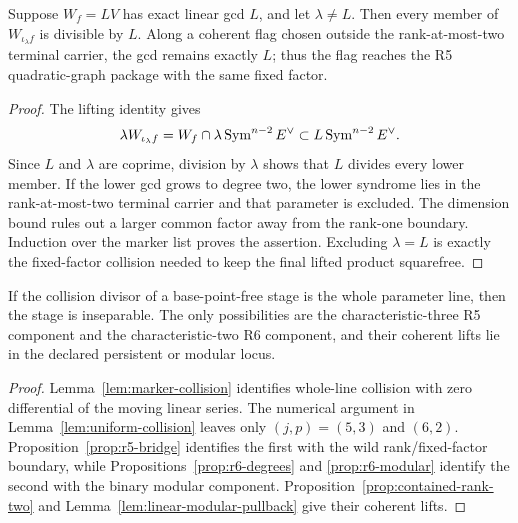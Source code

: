 \begin{lemma}
\label{lem:exact-linear-gcd-transport}%
%
%
Suppose \(W_f=L V\) has exact linear gcd \(L\), and let
\(\lambda\ne L\).  Then every member of
\(W_{\iota_\lambda f}\) is divisible by \(L\).  Along a coherent flag
chosen outside the rank-at-most-two terminal carrier, the gcd remains
exactly \(L\); thus the flag reaches the R5 quadratic-graph package with
the same fixed factor.
\end{lemma}

\begin{proof}
The lifting identity gives
\[
 \lambda W_{\iota_\lambda f}
   =W_f\cap\lambda\operatorname{Sym}^{n-2}E^\vee
   \subset L\operatorname{Sym}^{n-2}E^\vee .
\]
Since \(L\) and \(\lambda\) are coprime, division by \(\lambda\) shows
that \(L\) divides every lower member.  If the lower gcd grows to
degree two, the lower syndrome lies in the rank-at-most-two terminal
carrier and that parameter is excluded.  The dimension bound rules out
a larger common factor away from the rank-one boundary.  Induction over
the marker list proves the assertion.  Excluding \(\lambda=L\) is
exactly the fixed-factor collision needed to keep the final lifted
product squarefree.
\end{proof}

\begin{lemma}
\label{lem:identically-colliding}%
%
If the collision divisor of a base-point-free stage is the whole
parameter line, then the stage is inseparable.  The only possibilities
are the characteristic-three R5 component and the characteristic-two
R6 component, and their coherent lifts lie in the declared
persistent or modular locus.
\end{lemma}

\begin{proof}
Lemma~\ref{lem:marker-collision} identifies whole-line collision with
zero differential of the moving linear series.  The numerical argument
in Lemma~\ref{lem:uniform-collision} leaves only
\((j,p)=(5,3)\) and \((6,2)\).  Proposition~\ref{prop:r5-bridge}
identifies the first with the wild rank/fixed-factor boundary, while
Propositions~\ref{prop:r6-degrees} and
\ref{prop:r6-modular} identify the second with the binary modular
component.  Proposition~\ref{prop:contained-rank-two} and
Lemma~\ref{lem:linear-modular-pullback} give their coherent lifts.
\end{proof}

